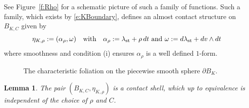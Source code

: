 \documentclass[12pt]{paper}
\theoremstyle{plain}
\newtheorem{lemma}[theorem]{Lemma}
\theoremstyle{definition}
\newcommand{\R}{{\mathbb{R}}}
\newcommand{\st}{{\rm st}}
\numberwithin{figure}{section}
\begin{document}
See Figure~\ref{f:Rho} for a schematic picture of such a family of functions.
Such a family, which exists by \eqref{e:KBoundary}, defines an almost contact structure on $B_{K, C}$ given by
\begin{equation}\label{S1ContactForm}
	\eta_{K, \rho} := (\alpha_\rho, \omega) \quad\mbox{with}\quad \alpha_\rho := \lambda_{\st} + \rho\,dt
	\mbox{ and } \omega := d\lambda_{\st} + dv\wedge dt
\end{equation}
where smoothness and condition (i) ensures $\alpha_\rho$ is a well defined $1$-form.
\begin{figure}
   \centering
   \def\svgwidth{150pt}
   
   \caption{The characteristic foliation on the piecewise smooth sphere $\partial B_K$.}
  \label{f:poly}
\end{figure} 
\begin{lemma}\label{l:CircleShell}
	The pair $(B_{K,C}, \eta_{K,\rho})$ is a contact shell, which up to 
	equivalence is independent of the choice of $\rho$ and $C$.
\end{lemma}
\end{document}
